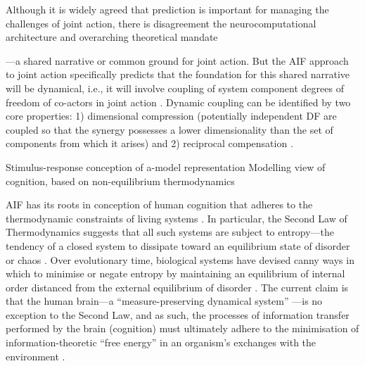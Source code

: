 \begin{CJK}{UTF8}{gbsn}
Although it is widely agreed that prediction is important for managing the challenges of joint action, there is disagreement the neurocomputational architecture and overarching theoretical mandate


---a shared narrative or common ground for joint action.  But the AIF approach to joint action specifically predicts that the foundation for this shared narrative will be dynamical, i.e., it will involve coupling of system component degrees of freedom of co-actors in joint action \citep{Turvey1978,Schmidt1990}. Dynamic coupling can be identified by two core properties:  1) dimensional compression (potentially independent DF are coupled so that the synergy possesses a lower dimensionality than the set of components from which it arises) and 2) reciprocal compensation \citep[the ability of one component of a synergy to react to changes in others][]{Riley2011}.


Stimulus-response conception of a-model representation
Modelling view of cognition, based on non-equilibrium thermodynamics

    AIF has its roots in conception of human cognition that adheres to the thermodynamic constraints of living systems \citep{Yufik2017}.  In particular, the Second Law of Thermodynamics suggests that all such systems are subject to entropy---the tendency of a closed system to dissipate toward an equilibrium state of disorder or chaos \citep{Wolfram2002}.  Over evolutionary time, biological systems have devised canny ways in which to minimise or negate entropy by maintaining an equilibrium of internal order distanced from the external equilibrium of disorder \citep{Schrodinger1944}.
    The current claim is that the human brain---a ``measure-preserving dynamical system'' \citep{Friston2013}---is no exception to the Second Law, and as such, the processes of information transfer performed by the brain (cognition) must ultimately adhere to the minimisation of information-theoretic ``free energy'' in an organism's exchanges with the environment \citep[entropy can be understood as the average quantity of free energy to which an organism is subject][]{Yufik2002,Yufik2013,Friston2010,Sengupta2013,Sengupta2016,Sengupta2017}.


\end{CJK}

